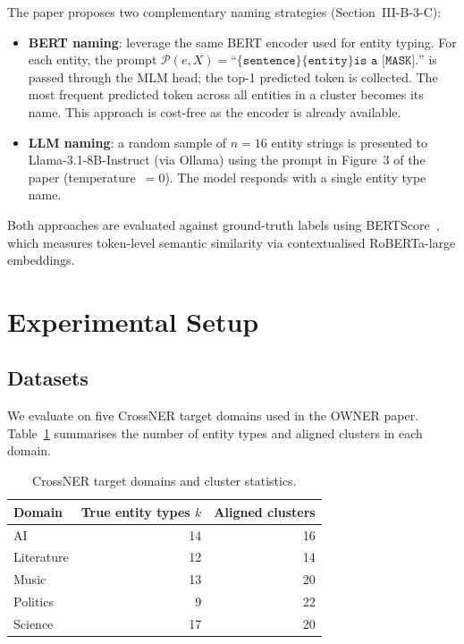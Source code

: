 \documentclass[11pt,a4paper]{article}
\begin{document}
The paper proposes two complementary naming strategies (Section~III-B-3-C):

\begin{itemize}[leftmargin=1.5em]
  \item \textbf{BERT naming}: leverage the same BERT encoder used for entity
    typing. For each entity, the prompt
    $\mathcal{P}(e,X)=\texttt{``\{sentence\} \{entity\} is a [MASK].''}$
    is passed through the MLM head; the top-1 predicted token is collected.
    The most frequent predicted token across all entities in a cluster
    becomes its name. This approach is cost-free as the encoder is already
    available.
  \item \textbf{LLM naming}: a random sample of $n=16$ entity strings is
    presented to Llama-3.1-8B-Instruct (via Ollama) using the prompt in
    Figure~3 of the paper (temperature~$= 0$). The model responds with a
    single entity type name.
\end{itemize}

\noindent
Both approaches are evaluated against ground-truth labels using
BERTScore~\cite{zhang2020bertscore}, which measures token-level semantic
similarity via contextualised RoBERTa-large embeddings.

\section{Experimental Setup}

\subsection{Datasets}

We evaluate on five CrossNER target domains used in the OWNER paper.
Table~\ref{tab:datasets} summarises the number of entity types and aligned
clusters in each domain.

\begin{table}[h]
\centering
\caption{CrossNER target domains and cluster statistics.}
\label{tab:datasets}
\setlength{\tabcolsep}{8pt}
\begin{tabular}{l r r}
\toprule
\textbf{Domain} & \textbf{True entity types} $k$ & \textbf{Aligned clusters} \\
\midrule
AI         & 14 & 16 \\
Literature & 12 & 14 \\
Music      & 13 & 20 \\
Politics   & 9  & 22 \\
Science    & 17 & 20 \\
\bottomrule
\end{tabular}
\end{table}
\end{document}
